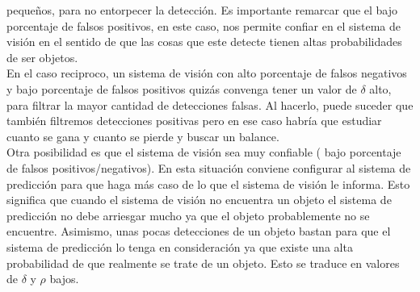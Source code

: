 	pequeños, para no entorpecer la detección. Es importante remarcar 
	que el bajo porcentaje de falsos positivos, en este caso, nos 
	permite confiar en el sistema de visión en el sentido de que las cosas que 
	este detecte tienen altas probabilidades de ser objetos. \\
	\indent En el caso reciproco, un sistema de visión con alto 
	porcentaje de falsos negativos y bajo porcentaje de falsos 
	positivos quizás convenga tener un valor de $\delta$ alto, para 
	filtrar la mayor cantidad de detecciones falsas. Al hacerlo, puede 
	suceder que también filtremos detecciones positivas pero en ese 
	caso habría que estudiar cuanto se gana y cuanto se pierde y 
	buscar un balance.\\
	\indent Otra posibilidad es que el sistema de visión sea muy 
	confiable ( bajo porcentaje de falsos positivos/negativos). En 
	esta situación conviene configurar al sistema de predicción para 
	que haga más caso de lo que el sistema de visión le informa. Esto 
	significa que cuando el sistema de visión no encuentra un objeto 
	el sistema de predicción no debe arriesgar mucho ya que el objeto 
	probablemente no se encuentre. Asimismo, unas pocas detecciones de 
	un objeto bastan para que el sistema de predicción lo tenga 
	en consideración ya que existe una alta probabilidad de que 
	realmente se trate de un objeto. Esto se traduce en valores de 
	$\delta$ y $\rho$ bajos.
 



